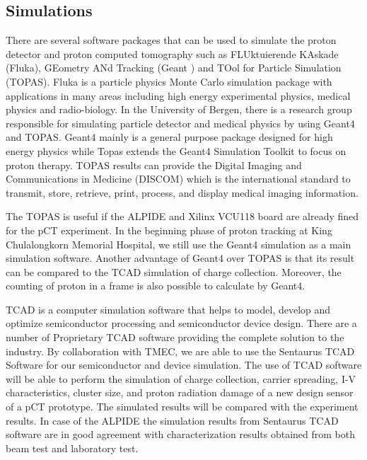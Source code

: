 \documentclass[12pt,a4paper]{article}
\begin{document}
\subsection{Simulations}

There are several software packages that can be used to simulate the proton detector and proton computed tomography such as  FLUktuierende KAskade (Fluka), GEometry ANd Tracking (Geant ) and TOol for Particle Simulation (TOPAS).  Fluka is a particle physics Monte Carlo simulation package with applications in many areas including  high energy experimental physics, medical physics and radio-biology.   In the University of Bergen, there is a research group responsible for simulating particle detector and medical physics by using Geant4 and TOPAS. Geant4 mainly is a general purpose package designed for high energy physics while Topas extends the Geant4 Simulation Toolkit to focus on proton therapy. TOPAS results can provide the Digital Imaging and Communications in Medicine (DISCOM) which is the international standard to transmit, store, retrieve, print, process, and display medical imaging information.  

The TOPAS is useful if the ALPIDE and Xilinx VCU118 board are already fined for the pCT experiment. In the beginning phase of proton tracking at King Chulalongkorn Memorial Hospital, we still use the Geant4 simulation as a main simulation software. Another advantage of Geant4  over TOPAS is that its result can be compared to the TCAD simulation of charge collection. Moreover, the counting of proton in a frame is also possible to calculate by Geant4. 

TCAD is a computer simulation software that helps to model, develop and optimize semiconductor processing and semiconductor device design. There are a number of Proprietary TCAD software providing the complete solution to the industry.   By collaboration with TMEC, we are able to use the Sentaurus TCAD Software for our semiconductor and device simulation.  The use of TCAD software will be able to perform the simulation of charge collection, carrier spreading, I-V characteristics, cluster size, and proton radiation damage of a new design sensor of a pCT prototype. The simulated results will be compared with the experiment results. In case of the  ALPIDE the simulation results from Sentaurus TCAD software are in good agreement with characterization results obtained from both beam test and laboratory test. 
\end{document}
